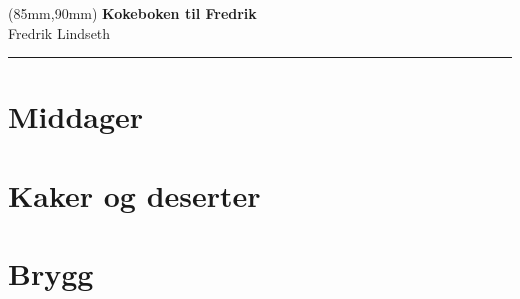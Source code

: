 \documentclass[12pt,a4paper]{book}
\begin{document}


\thispagestyle{empty}
\null\newpage

\thispagestyle{empty}
\begin{textblock*}{90mm}(85mm,90mm)
\noindent
{\sffamily\LARGE\bfseries Kokeboken til Fredrik}\\
\noindent
{\sffamily\small Fredrik Lindseth}\\
{\color{dark-gray}\rule[5pt]{220pt}{3pt}}
\end{textblock*}
\null\newpage

\thispagestyle{empty}


\tableofcontents
\clearpage

\setcounter{page}{1}





\chapter{Middager}


\chapter{Kaker og deserter}


\chapter{Brygg}


\printindex
\end{document}
